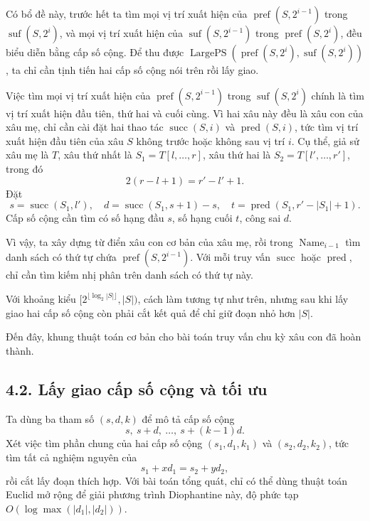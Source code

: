 \documentclass[11pt]{article}
\begin{document}
Có bổ đề này, trước hết ta tìm mọi vị trí xuất hiện của
\(\operatorname{pref}(S,2^{i-1})\) trong \(\operatorname{suf}(S,2^i)\), và mọi
vị trí xuất hiện của \(\operatorname{suf}(S,2^{i-1})\) trong
\(\operatorname{pref}(S,2^i)\), đều biểu diễn bằng cấp số cộng. Để thu được
\(\operatorname{LargePS}(\operatorname{pref}(S,2^i),\operatorname{suf}(S,2^i))\),
ta chỉ cần tịnh tiến hai cấp số cộng nói trên rồi lấy giao.

Việc tìm mọi vị trí xuất hiện của \(\operatorname{pref}(S,2^{i-1})\) trong
\(\operatorname{suf}(S,2^i)\) chính là tìm vị trí xuất hiện đầu tiên, thứ hai
và cuối cùng. Vì hai xâu này đều là xâu con của xâu mẹ, chỉ cần cài đặt hai
thao tác \(\operatorname{succ}(S,i)\) và \(\operatorname{pred}(S,i)\), tức tìm
vị trí xuất hiện đầu tiên của xâu \(S\) không trước hoặc không sau vị trí \(i\).
Cụ thể, giả sử xâu mẹ là \(T\), xâu thứ nhất là
\(S_1=T[l,\ldots,r]\), xâu thứ hai là \(S_2=T[l',\ldots,r']\), trong đó
\[
  2(r-l+1)=r'-l'+1.
\]
Đặt
\[
  s=\operatorname{succ}(S_1,l'),\quad
  d=\operatorname{succ}(S_1,s+1)-s,\quad
  t=\operatorname{pred}(S_1,r'-|S_1|+1).
\]
Cấp số cộng cần tìm có số hạng đầu \(s\), số hạng cuối \(t\), công sai \(d\).

Vì vậy, ta xây dựng từ điển xâu con cơ bản của xâu mẹ, rồi trong
\(\operatorname{Name}_{i-1}\) tìm danh sách có thứ tự chứa
\(\operatorname{pref}(S,2^{i-1})\). Với mỗi truy vấn \(\operatorname{succ}\) hoặc
\(\operatorname{pred}\), chỉ cần tìm kiếm nhị phân trên danh sách có thứ tự này.

Với khoảng kiểu \([2^{\lfloor\log_2|S|\rfloor},|S|)\), cách làm tương tự như
trên, nhưng sau khi lấy giao hai cấp số cộng còn phải cắt kết quả để chỉ giữ
đoạn nhỏ hơn \(|S|\).

Đến đây, khung thuật toán cơ bản cho bài toán truy vấn chu kỳ xâu con đã hoàn
thành.

\subsection*{4.2. Lấy giao cấp số cộng và tối ưu}

Ta dùng ba tham số \((s,d,k)\) để mô tả cấp số cộng
\[
  s,\ s+d,\ \ldots,\ s+(k-1)d.
\]
Xét việc tìm phần chung của hai cấp số cộng \((s_1,d_1,k_1)\) và
\((s_2,d_2,k_2)\), tức tìm tất cả nghiệm nguyên của
\[
  s_1+xd_1=s_2+yd_2,
\]
rồi cắt lấy đoạn thích hợp. Với bài toán tổng quát, chỉ có thể dùng thuật toán
Euclid mở rộng để giải phương trình Diophantine này, độ phức tạp
\(O(\log\max(|d_1|,|d_2|))\).
\end{document}
